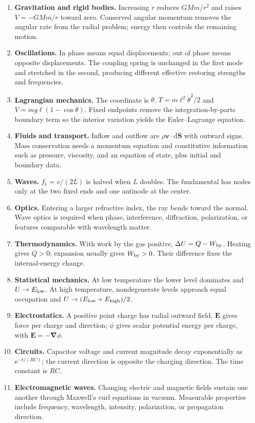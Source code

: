 \documentclass[11pt,oneside]{book}
\newcommand{\dd}{\mathrm{d}}
\newcommand{\ee}{\mathrm{e}}
\newcommand{\vect}[1]{\boldsymbol{#1}}
\newcommand{\grad}{\boldsymbol{\nabla}}
\theoremstyle{reviewstyle}
\begin{document}
\begin{enumerate}
\item \textbf{Gravitation and rigid bodies.} Increasing $r$ reduces $GMm/r^2$ and raises $V=-GMm/r$ toward zero. Conserved angular momentum removes the angular rate from the radial problem; energy then controls the remaining motion.
\item \textbf{Oscillations.} In phase means equal displacements; out of phase means opposite displacements. The coupling spring is unchanged in the first mode and stretched in the second, producing different effective restoring strengths and frequencies.
\item \textbf{Lagrangian mechanics.} The coordinate is $\theta$. $T=m\ell^2\dot\theta^2/2$ and $V=mg\ell(1-\cos\theta)$. Fixed endpoints remove the integration-by-parts boundary term so the interior variation yields the Euler--Lagrange equation.
\item \textbf{Fluids and transport.} Inflow and outflow are $\rho\vect v\cdot\dd\vect S$ with outward signs. Mass conservation needs a momentum equation and constitutive information such as pressure, viscosity, and an equation of state, plus initial and boundary data.
\item \textbf{Waves.} $f_1=v/(2L)$ is halved when $L$ doubles. The fundamental has nodes only at the two fixed ends and one antinode at the center.
\item \textbf{Optics.} Entering a larger refractive index, the ray bends toward the normal. Wave optics is required when phase, interference, diffraction, polarization, or features comparable with wavelength matter.
\item \textbf{Thermodynamics.} With work by the gas positive, $\Delta U=Q-W_{\rm by}$. Heating gives $Q>0$; expansion usually gives $W_{\rm by}>0$. Their difference fixes the internal-energy change.
\item \textbf{Statistical mechanics.} At low temperature the lower level dominates and $U\to E_{\rm low}$. At high temperature, nondegenerate levels approach equal occupation and $U\to(E_{\rm low}+E_{\rm high})/2$.
\item \textbf{Electrostatics.} A positive point charge has radial outward field. $\vect E$ gives force per charge and direction; $\phi$ gives scalar potential energy per charge, with $\vect E=-\grad\phi$.
\item \textbf{Circuits.} Capacitor voltage and current magnitude decay exponentially as $\ee^{-t/(RC)}$; the current direction is opposite the charging direction. The time constant is $RC$.
\item \textbf{Electromagnetic waves.} Changing electric and magnetic fields sustain one another through Maxwell's curl equations in vacuum. Measurable properties include frequency, wavelength, intensity, polarization, or propagation direction.

\end{enumerate}
\end{document}
